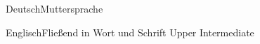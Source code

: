 \documentclass[a4paper,10pt]{cv}
\begin{document}
      \vspace{-1.8em}
      \begin{multicols}{2}
        \begin{cvSkillItem}{Deutsch}{Muttersprache}
        \end{cvSkillItem}
        \begin{cvSkillItem}{Englisch}{Fließend in Wort und Schrift}
          Upper Intermediate
        \end{cvSkillItem}
      \end{multicols}

      \vspace{-1.8em}
\end{document}
